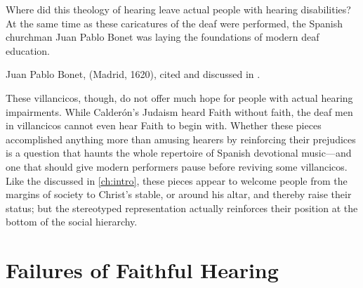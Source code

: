 Where did this theology of hearing leave actual people with hearing
disabilities? 
At the same time as these caricatures of the deaf were performed, the Spanish
churchman Juan Pablo Bonet was laying the foundations of modern deaf education.%
\begin{Footnote}
    Juan Pablo Bonet,  (Madrid, 1620), cited and discussed in
    \autocite{Plann:DeafEducationSpain}.  
\end{Footnote}
These villancicos, though, do not offer much hope for people with actual
hearing impairments.
While Calderón's Judaism heard Faith without faith, the deaf men in villancicos
cannot even hear Faith to begin with.
Whether these pieces accomplished anything more than amusing hearers by
reinforcing their prejudices is a question that haunts the whole repertoire of
Spanish devotional music---and one that should give modern performers pause
before reviving some villancicos.%
    \Autocite[7]{Cashner:WLSCM32}
Like the  discussed in \cref{ch:intro}, these pieces
appear to welcome people from the margins of society to Christ's stable, or
around his altar, and thereby raise their status; but the stereotyped
representation actually reinforces their position at the bottom of the social
hierarchy.

\section{Failures of Faithful Hearing}

